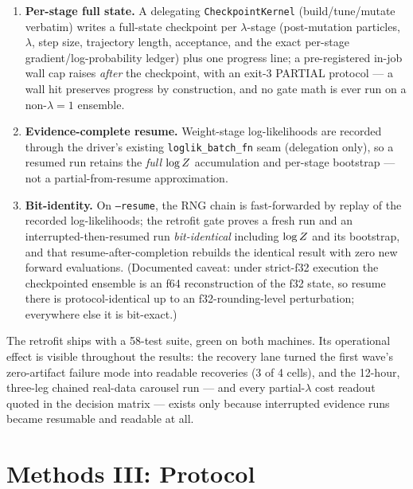 \begin{enumerate}
\item \textbf{Per-stage full state.} A delegating
  \texttt{CheckpointKernel} (build/tune/mutate verbatim) writes a
  full-state checkpoint per $\lambda$-stage (post-mutation particles,
  $\lambda$, step size, trajectory length, acceptance, and the exact
  per-stage gradient/log-probability ledger) plus one progress line; a
  pre-registered in-job wall cap raises \emph{after} the checkpoint, with
  an exit-3 PARTIAL protocol --- a wall hit preserves progress by
  construction, and no gate math is ever run on a non-$\lambda{=}1$
  ensemble.
\item \textbf{Evidence-complete resume.} Weight-stage log-likelihoods are
  recorded through the driver's existing \texttt{loglik\_batch\_fn} seam
  (delegation only), so a resumed run retains the \emph{full} $\log Z$
  accumulation and per-stage bootstrap --- not a partial-from-resume
  approximation.
\item \textbf{Bit-identity.} On \texttt{--resume}, the RNG chain is
  fast-forwarded by replay of the recorded log-likelihoods; the retrofit
  gate proves a fresh run and an interrupted-then-resumed run
  \emph{bit-identical} including $\log Z$ and its bootstrap, and that
  resume-after-completion rebuilds the identical result with zero new
  forward evaluations. (Documented caveat: under strict-f32 execution the
  checkpointed ensemble is an f64 reconstruction of the f32 state, so
  resume there is protocol-identical up to an f32-rounding-level
  perturbation; everywhere else it is bit-exact.)
\end{enumerate}

The retrofit ships with a 58-test suite, green on both machines. Its
operational effect is visible throughout the results: the recovery lane
turned the first wave's zero-artifact failure mode into readable
recoveries (3 of 4 cells), and the 12-hour, three-leg chained real-data
carousel run --- and every partial-$\lambda$ cost readout quoted in the
decision matrix --- exists only because interrupted evidence runs became
resumable and readable at all.

\section{Methods III: Protocol}
\label{sec:protocol-a}

